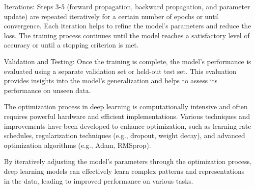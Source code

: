\documentclass[10pt,aspectratio=169,dvipsnames]{beamer} %
\begin{document}
{		Iterations: Steps 3-5 (forward propagation, backward propagation, and parameter update) are repeated iteratively for a certain number of epochs or until convergence. Each iteration helps to refine the model's parameters and reduce the loss. The training process continues until the model reaches a satisfactory level of accuracy or until a stopping criterion is met.
		
		Validation and Testing: Once the training is complete, the model's performance is evaluated using a separate validation set or held-out test set. This evaluation provides insights into the model's generalization and helps to assess its performance on unseen data.
		
		The optimization process in deep learning is computationally intensive and often requires powerful hardware and efficient implementations. Various techniques and improvements have been developed to enhance optimization, such as learning rate schedules, regularization techniques (e.g., dropout, weight decay), and advanced optimization algorithms (e.g., Adam, RMSprop).
		
		By iteratively adjusting the model's parameters through the optimization process, deep learning models can effectively learn complex patterns and representations in the data, leading to improved performance on various tasks.
	}
	
\end{document}
